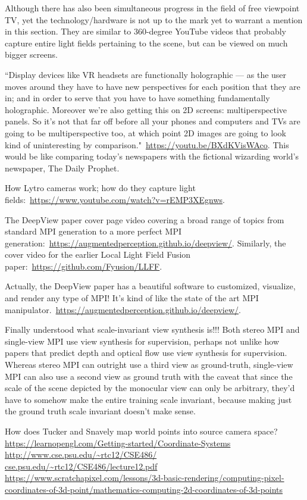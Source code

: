 Although there has also been simultaneous progress in the field of free viewpoint TV, yet the technology/hardware is not up to the mark yet to warrant a mention in this section. They are similar to 360-degree YouTube videos that probably capture entire light fields pertaining to the scene, but can be viewed on much bigger screens.

``Display devices like VR headsets are functionally holographic --- as the user moves around they have to have new perspectives for each position that they are in; and in order to serve that you have to have something fundamentally holographic. Moreover we're also getting this on 2D screens: multiperspective panels. So it's not that far off before all your phones and computers and TVs are going to be multiperspective too, at which point 2D images are going to look kind of uninteresting by comparison."~\url{https://youtu.be/BXdKVisWAco}. This would be like comparing today's newspapers with the fictional wizarding world's newspaper, The Daily Prophet.

How Lytro cameras work; how do they capture light fields:~\url{https://www.youtube.com/watch?v=rEMP3XEgnws}.

The DeepView paper cover page video covering a broad range of topics from standard MPI generation to a more perfect MPI generation:~\url{https://augmentedperception.github.io/deepview/}. Similarly, the cover video for the earlier Local Light Field Fusion paper:~\url{https://github.com/Fyusion/LLFF}. 

Actually, the DeepView paper has a beautiful software to customized, visualize, and render any type of MPI! It's kind of like the state of the art MPI manipulator.~\url{https://augmentedperception.github.io/deepview/}.

Finally understood what scale-invariant view synthesis is!!! Both stereo MPI and single-view MPI use view synthesis for supervision, perhaps not unlike how papers that predict depth and optical flow use view synthesis for supervision. Whereas stereo MPI can outright use a third view as ground-truth, single-view MPI can also use a second view as ground truth with the caveat that since the scale of the scene depicted by the monocular view can only be arbitrary, they'd have to somehow make the entire training scale invariant, because making just the ground truth scale invariant doesn't make sense.

How does Tucker and Snavely map world points into source camera space?
\url{https://learnopengl.com/Getting-started/Coordinate-Systems}
\url{http://www.cse.psu.edu/~rtc12/CSE486/}
\url{cse.psu.edu/~rtc12/CSE486/lecture12.pdf}
\url{https://www.scratchapixel.com/lessons/3d-basic-rendering/computing-pixel-coordinates-of-3d-point/mathematics-computing-2d-coordinates-of-3d-points}

